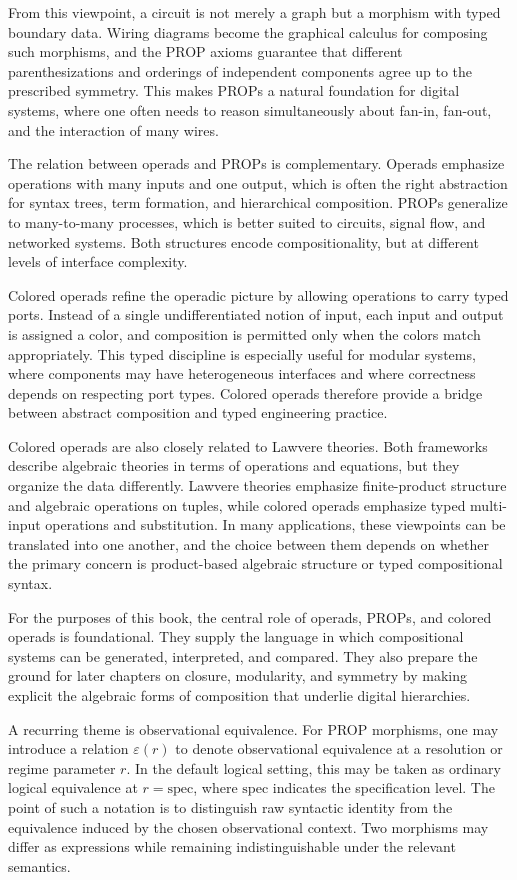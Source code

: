 \documentclass[11pt]{article}
\begin{document}
From this viewpoint, a circuit is not merely a graph but a morphism with typed boundary data. Wiring diagrams become the graphical calculus for composing such morphisms, and the PROP axioms guarantee that different parenthesizations and orderings of independent components agree up to the prescribed symmetry. This makes PROPs a natural foundation for digital systems, where one often needs to reason simultaneously about fan-in, fan-out, and the interaction of many wires.

The relation between operads and PROPs is complementary. Operads emphasize operations with many inputs and one output, which is often the right abstraction for syntax trees, term formation, and hierarchical composition. PROPs generalize to many-to-many processes, which is better suited to circuits, signal flow, and networked systems. Both structures encode compositionality, but at different levels of interface complexity.

Colored operads refine the operadic picture by allowing operations to carry typed ports. Instead of a single undifferentiated notion of input, each input and output is assigned a color, and composition is permitted only when the colors match appropriately. This typed discipline is especially useful for modular systems, where components may have heterogeneous interfaces and where correctness depends on respecting port types. Colored operads therefore provide a bridge between abstract composition and typed engineering practice.

Colored operads are also closely related to Lawvere theories. Both frameworks describe algebraic theories in terms of operations and equations, but they organize the data differently. Lawvere theories emphasize finite-product structure and algebraic operations on tuples, while colored operads emphasize typed multi-input operations and substitution. In many applications, these viewpoints can be translated into one another, and the choice between them depends on whether the primary concern is product-based algebraic structure or typed compositional syntax.

For the purposes of this book, the central role of operads, PROPs, and colored operads is foundational. They supply the language in which compositional systems can be generated, interpreted, and compared. They also prepare the ground for later chapters on closure, modularity, and symmetry by making explicit the algebraic forms of composition that underlie digital hierarchies.

A recurring theme is observational equivalence. For PROP morphisms, one may introduce a relation \(\varepsilon(r)\) to denote observational equivalence at a resolution or regime parameter \(r\). In the default logical setting, this may be taken as ordinary logical equivalence at \(r = \mathrm{spec}\), where \(\mathrm{spec}\) indicates the specification level. The point of such a notation is to distinguish raw syntactic identity from the equivalence induced by the chosen observational context. Two morphisms may differ as expressions while remaining indistinguishable under the relevant semantics.
\end{document}
